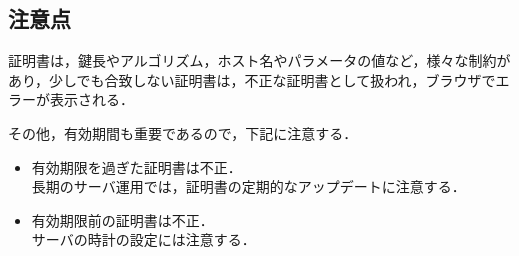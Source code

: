 \subsection{注意点}

証明書は，鍵長やアルゴリズム，ホスト名やパラメータの値など，様々な制約が
あり，少しでも合致しない証明書は，不正な証明書として扱われ，ブラウザでエ
ラーが表示される．

その他，有効期間も重要であるので，下記に注意する．

\begin{itemize}
    \item 有効期限を過ぎた証明書は不正．\\
    長期のサーバ運用では，証明書の定期的なアップデートに注意する．
    \item 有効期限前の証明書は不正．\\
    サーバの時計の設定には注意する．
\end{itemize}　

